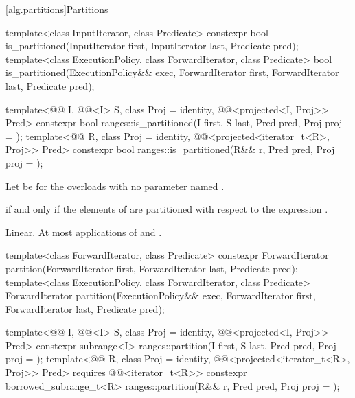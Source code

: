 [alg.partitions]{Partitions}

%
\begin{itemdecl}
template<class InputIterator, class Predicate>
  constexpr bool is_partitioned(InputIterator first, InputIterator last, Predicate pred);
template<class ExecutionPolicy, class ForwardIterator, class Predicate>
  bool is_partitioned(ExecutionPolicy&& exec,
                      ForwardIterator first, ForwardIterator last, Predicate pred);

template<@@ I, @@<I> S, class Proj = identity,
         @@<projected<I, Proj>> Pred>
  constexpr bool ranges::is_partitioned(I first, S last, Pred pred, Proj proj = {});
template<@@ R, class Proj = identity,
         @@<projected<iterator_t<R>, Proj>> Pred>
  constexpr bool ranges::is_partitioned(R&& r, Pred pred, Proj proj = {});
\end{itemdecl}

\begin{itemdescr}
\pnum
Let  be 
for the overloads with no parameter named .

\pnum
\returns
{} if and only if the elements  of 
are partitioned with respect to the expression
.

\pnum
\complexity
Linear.
At most  applications of  and .
\end{itemdescr}

%
\begin{itemdecl}
template<class ForwardIterator, class Predicate>
  constexpr ForwardIterator
    partition(ForwardIterator first, ForwardIterator last, Predicate pred);
template<class ExecutionPolicy, class ForwardIterator, class Predicate>
  ForwardIterator
    partition(ExecutionPolicy&& exec,
              ForwardIterator first, ForwardIterator last, Predicate pred);

template<@@ I, @@<I> S, class Proj = identity,
         @@<projected<I, Proj>> Pred>
  constexpr subrange<I>
    ranges::partition(I first, S last, Pred pred, Proj proj = {});
template<@@ R, class Proj = identity,
         @@<projected<iterator_t<R>, Proj>> Pred>
  requires @@<iterator_t<R>>
  constexpr borrowed_subrange_t<R>
    ranges::partition(R&& r, Pred pred, Proj proj = {});
\end{itemdecl}

